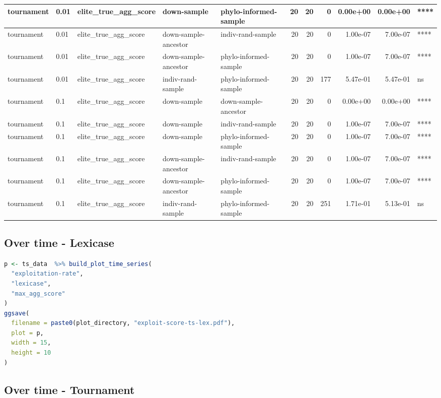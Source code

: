 \documentclass[
]{book}
\begin{document}
\begin{tabular}{l|l|l|l|l|r|r|r|r|r|l}
\hline
tournament & 0.01 & elite\_true\_agg\_score & down-sample & phylo-informed-sample & 20 & 20 & 0 & 0.00e+00 & 0.00e+00 & ****\\
\hline
tournament & 0.01 & elite\_true\_agg\_score & down-sample-ancestor & indiv-rand-sample & 20 & 20 & 0 & 1.00e-07 & 7.00e-07 & ****\\
\hline
tournament & 0.01 & elite\_true\_agg\_score & down-sample-ancestor & phylo-informed-sample & 20 & 20 & 0 & 1.00e-07 & 7.00e-07 & ****\\
\hline
tournament & 0.01 & elite\_true\_agg\_score & indiv-rand-sample & phylo-informed-sample & 20 & 20 & 177 & 5.47e-01 & 5.47e-01 & ns\\
\hline
tournament & 0.1 & elite\_true\_agg\_score & down-sample & down-sample-ancestor & 20 & 20 & 0 & 0.00e+00 & 0.00e+00 & ****\\
\hline
tournament & 0.1 & elite\_true\_agg\_score & down-sample & indiv-rand-sample & 20 & 20 & 0 & 1.00e-07 & 7.00e-07 & ****\\
\hline
tournament & 0.1 & elite\_true\_agg\_score & down-sample & phylo-informed-sample & 20 & 20 & 0 & 1.00e-07 & 7.00e-07 & ****\\
\hline
tournament & 0.1 & elite\_true\_agg\_score & down-sample-ancestor & indiv-rand-sample & 20 & 20 & 0 & 1.00e-07 & 7.00e-07 & ****\\
\hline
tournament & 0.1 & elite\_true\_agg\_score & down-sample-ancestor & phylo-informed-sample & 20 & 20 & 0 & 1.00e-07 & 7.00e-07 & ****\\
\hline
tournament & 0.1 & elite\_true\_agg\_score & indiv-rand-sample & phylo-informed-sample & 20 & 20 & 251 & 1.71e-01 & 5.13e-01 & ns\\
\hline
\end{tabular}

\hypertarget{over-time---lexicase}{%
\subsection{Over time - Lexicase}\label{over-time---lexicase}}

\begin{lstlisting}[language=R]
p <- ts_data  %>% build_plot_time_series(
  "exploitation-rate",
  "lexicase",
  "max_agg_score"
)
ggsave(
  filename = paste0(plot_directory, "exploit-score-ts-lex.pdf"),
  plot = p,
  width = 15,
  height = 10
)
\end{lstlisting}

\hypertarget{over-time---tournament}{%
\subsection{Over time - Tournament}\label{over-time---tournament}}
\end{document}

